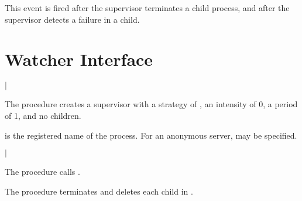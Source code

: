 This event is fired after the supervisor terminates a child process,
and after the supervisor detects a failure in a child.

\section {Watcher Interface}

\begin{procedure}
\end{procedure}

\returns{}
 $|$

The  procedure creates a supervisor with a
strategy of , an intensity of 0, a period of 1,
and no children.

 is the registered name of the process. For an anonymous
server,  may be specified.

\begin{procedure}
\end{procedure}

\returns{}
 $|$

The  procedure calls
.

\begin{procedure}
\end{procedure}

\returns{}

The  procedure terminates and
deletes each  child in .
